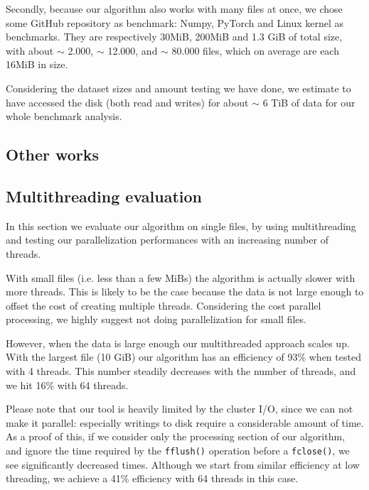 Secondly, because our algorithm also works with many files at once, we chose some GitHub repository as benchmark: Numpy, PyTorch and Linux kernel as benchmarks. They are respectively 30MiB, 200MiB and  1.3 GiB of total size, with about $\sim$ 2.000, $\sim$ 12.000, and  $\sim$ 80.000 files, which on average are each 16MiB in size.

Considering the dataset sizes and amount testing we have done, we estimate to have accessed the disk (both read and writes) for about $\sim$ 6 TiB of data for our whole benchmark analysis.

\subsection{Other works}

\subsection{Multithreading evaluation}
In this section we evaluate our algorithm on single files, by using multithreading and testing our parallelization performances with an increasing number of threads.

With small files (i.e. less than a few MiBs) the algorithm is actually slower with more threads. This is likely to be the case because the data is not large enough to offset the cost of creating multiple threads. Considering the cost parallel processing, we highly suggest not doing parallelization for small files.

However, when the data is large enough our multithreaded approach scales up. With the largest file (10 GiB) our algorithm has an efficiency of 93\% when tested with 4 threads. This number steadily decreases with the number of threads, and we hit 16\% with 64 threads.

Please note that our tool is heavily limited by the cluster I/O, since we can not make it parallel: especially writings to disk require a considerable amount of time. As a proof of this, if we consider only the processing section of our algorithm, and ignore the time required by the \verb|fflush()| operation before a \verb|fclose()|, we see significantly decreased times. Although we start from similar efficiency at low threading, we achieve a 41\% efficiency with 64 threads in this case. %

